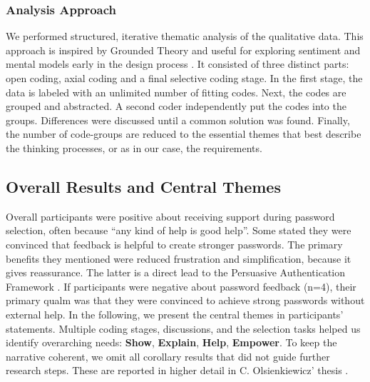 \subsubsection{Analysis Approach}
We performed structured, iterative thematic analysis of the qualitative data. This approach is inspired by Grounded  Theory and useful for exploring sentiment and mental models early in the design process \cite{Strauss1990}. It consisted of three distinct parts: open coding, axial coding and a final selective coding stage. In the first stage, the data is labeled with an unlimited number of fitting codes. Next, the codes are grouped and abstracted. A second coder independently put the codes into the groups. Differences were discussed until a common solution was found. Finally, the number of code-groups are reduced to the essential themes that best describe the thinking processes, or as in our case, the requirements. 


\subsection{Overall Results and Central Themes}

Overall participants were positive about receiving support during password selection, often because ``any kind of help is good help''. Some stated they were convinced that feedback is helpful to create stronger passwords. The primary benefits they mentioned were reduced frustration and simplification, because it gives reassurance. The latter is a direct lead to the Persuasive Authentication Framework \cite{Forget2007PersuasionEducationSecurity}. If participants were negative about password feedback (n=4), their primary qualm was that they were convinced to achieve strong passwords without external help. In the following, we present the central themes in participants' statements. Multiple coding stages, discussions, and the selection tasks helped us identify overarching needs: \textbf{Show}, \textbf{Explain}, \textbf{Help}, \textbf{Empower}. To keep the narrative coherent, we omit all corollary results that did not guide further research steps. These are reported in higher detail in C. Olsienkiewicz' thesis \cite{Olsienkiewicz2016BAThesis}. 

